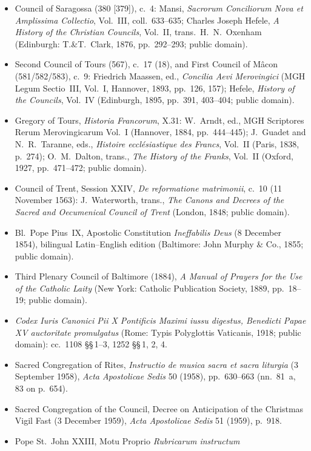 \begin{itemize}
\item Council of Saragossa (380 [379]), c.~4: Mansi, \textit{Sacrorum
Conciliorum Nova et Amplissima Collectio}, Vol.~III, coll.~633--635; Charles
Joseph Hefele, \textit{A History of the Christian Councils}, Vol.~II, trans.\
H.~N.~Oxenham (Edinburgh: T.\&T.~Clark, 1876, pp.~292--293; public domain).
\item Second Council of Tours (567), c.~17 (18), and First Council of M\^acon
(581/582/583), c.~9: Friedrich Maassen, ed., \textit{Concilia Aevi Merovingici}
(MGH Legum Sectio~III, Vol.~I, Hannover, 1893, pp.~126, 157); Hefele,
\textit{History of the Councils}, Vol.~IV (Edinburgh, 1895, pp.~391, 403--404;
public domain).
\item Gregory of Tours, \textit{Historia Francorum}, X.31: W.~Arndt, ed., MGH
Scriptores Rerum Merovingicarum Vol.~I (Hannover, 1884, pp.~444--445);
J.~Guadet and N.~R.~Taranne, eds., \textit{Histoire eccl\'esiastique des
Francs}, Vol.~II (Paris, 1838, p.~274); O.~M.~Dalton, trans., \textit{The
History of the Franks}, Vol.~II (Oxford, 1927, pp.~471--472; public domain).
\item Council of Trent, Session XXIV, \textit{De reformatione matrimonii},
c.~10 (11 November 1563): J.~Waterworth, trans., \textit{The Canons and Decrees
of the Sacred and Oecumenical Council of Trent} (London, 1848; public domain).
\item Bl.~Pope Pius~IX, Apostolic Constitution \textit{Ineffabilis Deus}
(8 December 1854), bilingual Latin--English edition (Baltimore: John Murphy \&
Co., 1855; public domain).
\item Third Plenary Council of Baltimore (1884), \textit{A Manual of Prayers
for the Use of the Catholic Laity} (New York: Catholic Publication Society,
1889, pp.~18--19; public domain).
\item \textit{Codex Iuris Canonici Pii X Pontificis Maximi iussu digestus,
Benedicti Papae XV auctoritate promulgatus} (Rome: Typis Polyglottis Vaticanis,
1918; public domain): cc.~1108 \S\S\,1--3, 1252 \S\S\,1, 2, 4.
\item Sacred Congregation of Rites, \textit{Instructio de musica sacra et sacra
liturgia} (3 September 1958), \textit{Acta Apostolicae Sedis} 50 (1958),
pp.~630--663 (nn.~81~a, 83 on p.~654).
\item Sacred Congregation of the Council, Decree on Anticipation of the
Christmas Vigil Fast (3 December 1959), \textit{Acta Apostolicae Sedis} 51
(1959), p.~918.
\item Pope St.~John XXIII, Motu Proprio \textit{Rubricarum instructum}

\end{itemize}
